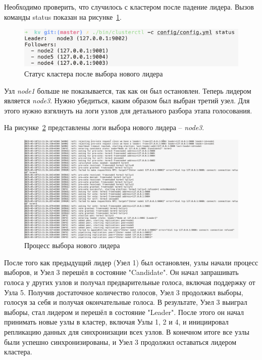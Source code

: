 Необходимо проверить, что случилось с кластером после падение лидера. Вызов команды status показан на рисунке~\ref{fig:fig12}.

\begin{figure}
  \centering
  \includegraphics[scale=0.5]{assets/status_after_election.png}
  \caption{Статус кластера после выбора нового лидера}
  \label{fig:fig12}
\end{figure}

Узл \textit{node1} больше не показывается, так как он был остановлен. Теперь лидером является \textit{node3}. Нужно убедиться, каким образом был выбран третий
узел. Для этого нужно взгялнуть на логи узлов для детального разбора этапа голосования.

На рисунке~\ref{fig:fig13} представлены логи выбора нового лидера -- \textit{node3}.

\begin{figure}
  \centering
  \includegraphics[scale=0.28]{assets/new_leader_election.png}
  \caption{Процесс выбора нового лидера}
  \label{fig:fig13}
\end{figure}

После того как предыдущий лидер (Узел 1) был остановлен, узлы начали процесс выборов, и Узел 3 перешёл в состояние "Candidate". Он начал запрашивать голоса у
других узлов и получал предварительные голоса, включая поддержку от Узла 5. Получив достаточное количество голосов, Узел 3 продолжил выборы, голосуя за себя и
получая окончательные голоса. В результате, Узел 3 выиграл выборы, стал лидером и перешёл в состояние "Leader". После этого он начал принимать новые узлы в
кластер, включая Узлы 1, 2 и 4, и инициировал репликацию данных для синхронизации всех узлов. В конечном итоге все узлы были успешно синхронизированы, и Узел 3 продолжил оставаться лидером кластера.

